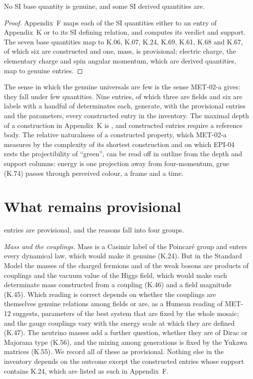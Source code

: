 \documentclass{situationist-preprint}
\begin{document}
\begin{corollary}\label{c:si}
No SI base quantity is genuine, and some SI derived quantities are.
\end{corollary}

\begin{proof}
Appendix~F maps each of the \vvNF{} SI quantities either to an entry of Appendix~K or to its SI defining relation, and computes its verdict and support. The seven base quantities map to K.06, K.07, K.24, K.69, K.61, K.68 and K.67, of which six are constructed and one, mass, is provisional; electric charge, the elementary charge and spin angular momentum, which are derived quantities, map to genuine entries.
\end{proof}

The sense in which the genuine universals are few is the sense MET-02-a gives: they fall under few quantities. Nine entries, of which three are fields and six are labels with a handful of determinates each, generate, with the provisional entries and the parameters, every constructed entry in the inventory. The maximal depth of a construction in Appendix~K is \vvNKmaxdepth{}, and \vvNKframe{} constructed entries require a reference body. The relative naturalness of a constructed property, which MET-02-a measures by the complexity of its shortest construction and on which EPI-04 rests the projectibility of \enquote{green}, can be read off in outline from the depth and support columns: energy is one projection away from four-momentum, grue (K.74) passes through perceived colour, a frame and a time.

\section{What remains provisional}\label{s:provisional}

\vvNKprovisional{} entries are provisional, and the reasons fall into four groups.

\emph{Mass and the couplings.} Mass is a Casimir label of the Poincar\'e group and enters every dynamical law, which would make it genuine (K.24). But in the Standard Model the masses of the charged fermions and of the weak bosons are products of couplings and the vacuum value of the Higgs field, which would make each determinate mass constructed from a coupling (K.46) and a field magnitude (K.45). Which reading is correct depends on whether the couplings are themselves genuine relations among fields or are, as a Humean reading of MET-12 suggests, parameters of the best system that are fixed by the whole mosaic; and the gauge couplings vary with the energy scale at which they are defined (K.47). The neutrino masses add a further question, whether they are of Dirac or Majorana type (K.56), and the mixing among generations is fixed by the Yukawa matrices (K.55). We record all of these as provisional. Nothing else in the inventory depends on the outcome except the constructed entries whose support contains K.24, which are listed as such in Appendix~F.
\end{document}
